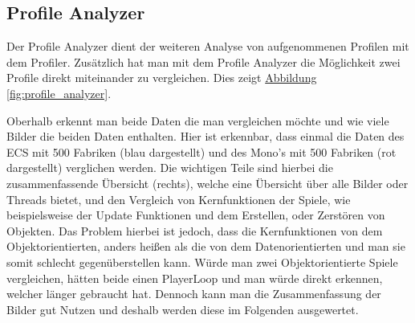 \subsection{Profile Analyzer}
Der Profile Analyzer dient der weiteren Analyse von aufgenommenen Profilen mit dem Profiler. Zusätzlich hat man mit dem Profile Analyzer die Möglichkeit zwei Profile direkt miteinander zu vergleichen. Dies zeigt \hyperref[fig:profile_analyzer]{Abbildung \ref*{fig:profile_analyzer}}.

Oberhalb erkennt man beide Daten die man vergleichen möchte und wie viele Bilder die beiden Daten enthalten. Hier ist erkennbar, dass einmal die Daten des ECS mit 500 Fabriken (blau dargestellt) und des Mono's mit 500 Fabriken (rot dargestellt) verglichen werden. Die wichtigen Teile sind hierbei die zusammenfassende Übersicht (rechts), welche eine Übersicht über alle Bilder oder Threads bietet, und den Vergleich von Kernfunktionen der Spiele, wie beispielsweise der Update Funktionen und dem Erstellen, oder Zerstören von Objekten. Das Problem hierbei ist jedoch, dass die Kernfunktionen von dem Objektorientierten, anders heißen als die von dem Datenorientierten und man sie somit schlecht gegenüberstellen kann. Würde man zwei Objektorientierte Spiele vergleichen, hätten beide einen PlayerLoop und man würde direkt erkennen, welcher länger gebraucht hat. Dennoch kann man die Zusammenfassung der Bilder gut Nutzen und deshalb werden diese im Folgenden ausgewertet.
